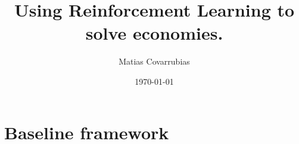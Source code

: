 \documentclass[11pt]{article}
\numberwithin{equation}{section}
\begin{document}
\title{Using Reinforcement Learning to solve economies.}

\author{Matias Covarrubias}

\medskip

\date{\today}

\thispagestyle{empty}



\newpage

\section{Baseline framework}
\end{document}

